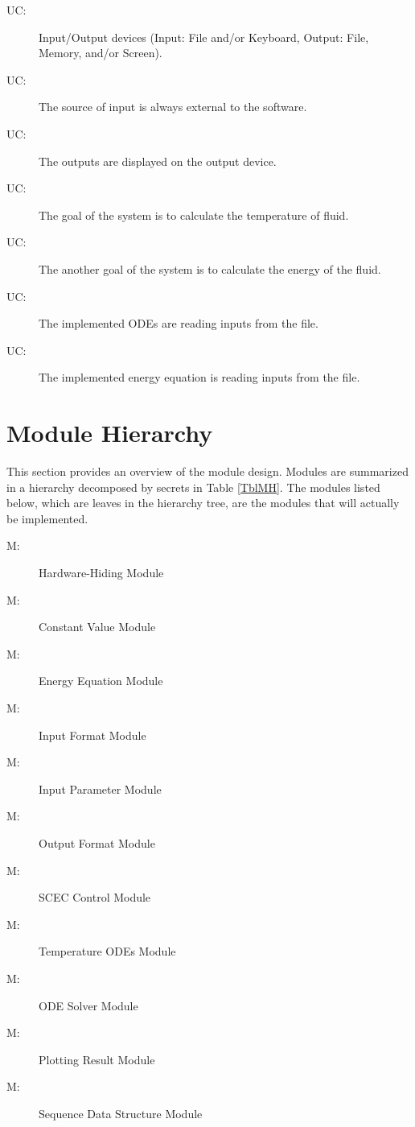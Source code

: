 \documentclass[12pt, titlepage]{article}
\newcounter{ucnum}
\newcommand{\uctheucnum}{UC\theucnum}
\newcounter{mnum}
\newcommand{\mthemnum}{M\themnum}
\begin{document}
\begin{description}
\item[ \uctheucnum \label{ucIO_1}:] Input/Output devices
  (Input: File and/or Keyboard, Output: File, Memory, and/or Screen).
\item[ \uctheucnum \label{ucInput_2}:] The source of input is always external to the software. 
\item[ \uctheucnum \label{ucOutput_3}:] The outputs are displayed on the output device. 
\item[ \uctheucnum \label{ucGoal_4}:] The goal of the system is to calculate the temperature of fluid. 
\item[ \uctheucnum \label{ucGoal_5}:] The another goal of the system is to calculate the energy of the fluid.
\item[ \uctheucnum \label{ucOde_6}:] The implemented ODEs are reading inputs from the file. 
\item[ \uctheucnum \label{ucEnergy_7}:] The implemented energy equation is reading inputs from the file.  

\end{description}

\section{Module Hierarchy} \label{SecMH}

This section provides an overview of the module design. Modules are summarized
in a hierarchy decomposed by secrets in Table \ref{TblMH}. The modules listed
below, which are leaves in the hierarchy tree, are the modules that will
actually be implemented.

\begin{description}
\item [ \mthemnum \label{1_mHH}:] Hardware-Hiding Module
\item [ \mthemnum \label{2_mHH}:] Constant Value Module
\item [ \mthemnum \label{3_mHH}:] Energy Equation Module
\item [ \mthemnum \label{4_mHH}:] Input Format Module
\item [ \mthemnum \label{5_mHH}:] Input Parameter Module
\item [ \mthemnum \label{6_mHH}:] Output Format Module
\item [ \mthemnum \label{7_mHH}:] SCEC Control Module
\item [ \mthemnum \label{8_mHH}:] Temperature ODEs Module
\item [ \mthemnum \label{9_mHH}:] ODE Solver Module
\item [ \mthemnum \label{10_mHH}:] Plotting Result Module
\item [ \mthemnum \label{12_mHH}:] Sequence Data Structure Module 

\end{description}
\end{document}
